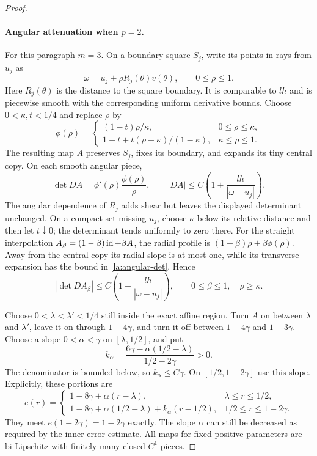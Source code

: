 \begin{proof}
\paragraph{Angular attenuation when $p=2$.}
For this paragraph $m=3$.  On a boundary square $S_j$, write its
points in rays from $u_j$ as
\[
 \omega=u_j+\rho R_j(\theta)v(\theta),\qquad 0\le\rho\le1.
\]
Here $R_j(\theta)$ is the distance to the square boundary.  It is
comparable to $lh$ and is piecewise smooth with the corresponding
uniform derivative bounds.  Choose $0<\kappa,t<1/4$ and
replace $\rho$ by
\[
 \phi(\rho)=
 \begin{cases}
  (1-t)\rho/\kappa,&0\le\rho\le\kappa,\\
  1-t+t(\rho-\kappa)/(1-\kappa),&\kappa\le\rho\le1.
 \end{cases}
\]
The resulting map $A$ preserves $S_j$, fixes its boundary, and
expands its tiny central copy.  On each smooth angular piece,
\begin{equation}\label{la:angular-det}
 \det DA=\phi'(\rho)\frac{\phi(\rho)}{\rho},
 \qquad
 |DA|\le C\left(1+\frac{lh}{|\omega-u_j|}\right).
\end{equation}
The angular dependence of $R_j$ adds shear but leaves the displayed
determinant unchanged.  On a compact set missing $u_j$, choose
$\kappa$ below its relative distance and then let $t\downarrow0$;
the determinant tends uniformly to zero there.  For the straight
interpolation $A_\beta=(1-\beta)\operatorname{id}+\beta A$, the radial profile is
$(1-\beta)\rho+\beta\phi(\rho)$.  Away from the central copy its
radial slope is at most one, while its transverse expansion has the
bound in \eqref{la:angular-det}.  Hence
\begin{equation}\label{la:angular-interpolation}
 |\det DA_\beta|
 \le C\left(1+\frac{lh}{|\omega-u_j|}\right),
 \qquad0\le\beta\le1,\quad\rho\ge\kappa.
\end{equation}

Choose $0<\lambda<\lambda'<1/4$ still inside the exact affine region.
Turn $A$ on between $\lambda$ and $\lambda'$, leave it on through
$1-4\gamma$, and turn it off between $1-4\gamma$ and $1-3\gamma$.
Choose a slope $0<\alpha<\gamma$ on $[\lambda,1/2]$, and put
\[
 k_\alpha=
 \frac{6\gamma-\alpha(1/2-\lambda)}{1/2-2\gamma}>0.
\]
The denominator is bounded below, so $k_\alpha\le C\gamma$.
On $[1/2,1-2\gamma]$ use this slope.  Explicitly, these portions are
\[
 e(r)=
 \begin{cases}
  1-8\gamma+\alpha(r-\lambda),&\lambda\le r\le1/2,\\
  1-8\gamma+\alpha(1/2-\lambda)+k_\alpha(r-1/2),
       &1/2\le r\le1-2\gamma.
 \end{cases}
\]
They meet $e(1-2\gamma)=1-2\gamma$ exactly.  The slope $\alpha$
can still be decreased as required by the inner error estimate.
All maps for fixed positive parameters are bi-Lipschitz with
finitely many closed $C^1$ pieces.


\end{proof}
